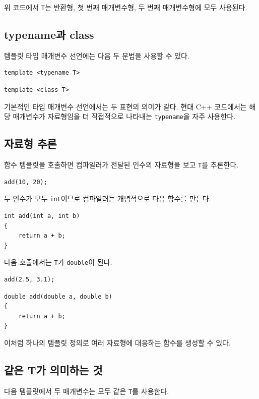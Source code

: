 \documentclass[11pt,a4paper]{article}
\begin{document}
위 코드에서 \texttt{T}는 반환형, 첫 번째 매개변수형, 두 번째 매개변수형에 모두 사용된다.

\subsection{typename과 class}
템플릿 타입 매개변수 선언에는 다음 두 문법을 사용할 수 있다.

\begin{lstlisting}
template <typename T>
\end{lstlisting}

\begin{lstlisting}
template <class T>
\end{lstlisting}

기본적인 타입 매개변수 선언에서는 두 표현의 의미가 같다. 현대 C++ 코드에서는 해당 매개변수가 자료형임을 더 직접적으로 나타내는 \texttt{typename}을 자주 사용한다.

\subsection{자료형 추론}
함수 템플릿을 호출하면 컴파일러가 전달된 인수의 자료형을 보고 \texttt{T}를 추론한다.

\begin{lstlisting}
add(10, 20);
\end{lstlisting}

두 인수가 모두 \texttt{int}이므로 컴파일러는 개념적으로 다음 함수를 만든다.

\begin{lstlisting}
int add(int a, int b)
{
    return a + b;
}
\end{lstlisting}

다음 호출에서는 \texttt{T}가 \texttt{double}이 된다.

\begin{lstlisting}
add(2.5, 3.1);
\end{lstlisting}

\begin{lstlisting}
double add(double a, double b)
{
    return a + b;
}
\end{lstlisting}

이처럼 하나의 템플릿 정의로 여러 자료형에 대응하는 함수를 생성할 수 있다.

\subsection{같은 T가 의미하는 것}
다음 템플릿에서 두 매개변수는 모두 같은 \texttt{T}를 사용한다.
\end{document}
